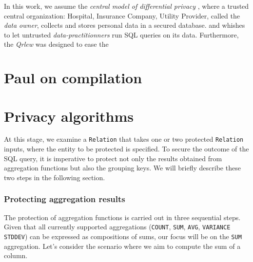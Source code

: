 \documentclass[letterpaper]{article} %
\newcommand{\qrlew}{\emph{Qrlew}}
\begin{document}
In this work, we assume the \emph{central model of differential privacy} \cite{near2020threat}, where a trusted central organization: Hospital, Insurance Company, Utility Provider, called the \emph{data owner}, collects and stores personal data in a secured database. and whishes to let untrusted \emph{data-practitionners} run SQL queries on its data.
Furthermore, the
\qrlew{} was designed to ease the

\section{Paul on compilation}

\section{Privacy algorithms}
\label{sec:privacy_algos}

At this stage, we examine a \texttt{Relation} that takes one or two protected \texttt{Relation} inputs, where the entity to be protected is specified.
To secure the outcome of the SQL query, it is imperative to protect not only the results obtained from aggregation functions but also the grouping keys.
We will briefly describe these two steps in the following section.

\subsubsection{Protecting aggregation results}

The protection of aggregation functions is carried out in three sequential steps. Given that all currently supported aggregations (\texttt{COUNT}, \texttt{SUM}, \texttt{AVG}, \texttt{VARIANCE} \texttt{STDDEV}) can be expressed as compositions of sums, our focus will be on the \texttt{SUM} aggregation. Let's consider the scenario where we aim to compute the sum of a column.
\end{document}
